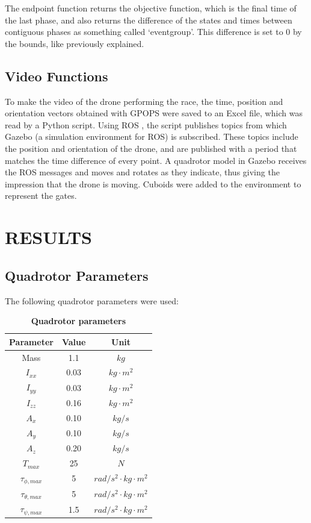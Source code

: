 \documentclass[letterpaper, 10 pt, conference]{ieeeconf}  %
\begin{document}
The endpoint function returns the objective function, which is the final time of the last phase, and also returns the difference of the states and times between contiguous phases as something called `eventgroup'. This difference is set to 0 by the bounds, like previously explained.

\subsection{Video Functions}\label{subs:video}

To make the video of the drone performing the race, the time, position and orientation vectors obtained with GPOPS were saved to an Excel file, which was read by a Python script. Using ROS \cite{quigley2009ros}, the script publishes topics from which Gazebo \cite{koenig2004design} (a simulation environment for ROS) is subscribed. These topics include the position and orientation of the drone, and are published with a period that matches the time difference of every point. A quadrotor model in Gazebo receives the ROS messages and moves and rotates as they indicate, thus giving the impression that the drone is moving. Cuboids were added to the environment to represent the gates.


\section{RESULTS}\label{s:res}

\subsection{Quadrotor Parameters}

The following quadrotor parameters were used:

\begin{table}[!htpb]
	\caption[Quadrotor parameters]{\bf Quadrotor parameters}
	\label{tbl:drone-params}
	\centering
	\def\arraystretch{1.3}
	\setlength{\tabcolsep}{3pt}
	\begin{tabular}{ccc}
		\textbf{Parameter} & \textbf{Value} & \textbf{Unit} \\ 
		\hline
		Mass & 1.1 & $kg$ \\
		$I_{xx}$  & 0.03 & $kg \cdot m^2$  \\
		$I_{yy}$  & 0.03 & $kg \cdot m^2$  \\
		$I_{zz}$  & 0.16 & $kg \cdot m^2$  \\
		$A_x$     & 0.10 & $kg / s$  \\
		$A_y$     & 0.10 & $kg / s$  \\
		$A_z$     & 0.20 & $kg / s$  \\
		$T_{max}$ & 25   & $N$  \\
		$\tau_{\phi, max}$   & 5    & $ rad/s^2 \cdot kg \cdot m^2$  \\
		$\tau_{\theta, max}$ & 5    & $ rad/s^2 \cdot kg \cdot m^2$  \\
		$\tau_{\psi, max}$   & 1.5  & $ rad/s^2 \cdot kg \cdot m^2$  \\		
	\end{tabular}
\end{table}
\end{document}
